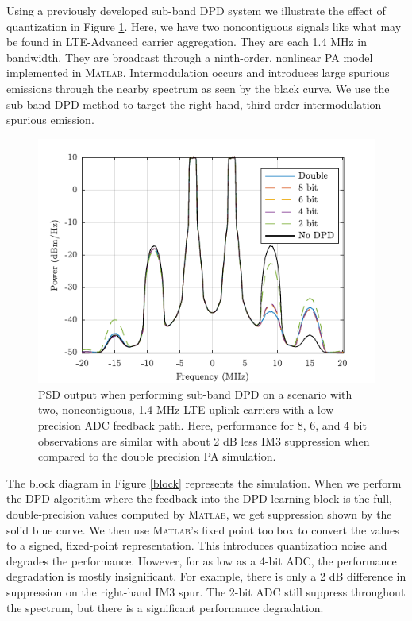 \documentclass[conference]{IEEEtran}
\begin{document}
Using a previously developed sub-band DPD system \cite{TMTT_SubbandDPD} we illustrate the effect of quantization in Figure \ref{subbandpsd}. Here, we have two noncontiguous signals like what may be found in LTE-Advanced carrier aggregation. They are each 1.4 MHz in bandwidth. They are broadcast through a ninth-order, nonlinear PA model implemented in \textsc{Matlab}. 
Intermodulation occurs and introduces large spurious emissions through the nearby spectrum as seen by the black curve. We use the sub-band DPD method to target the right-hand, third-order intermodulation spurious emission.

\begin{figure}[]
\centering
\includegraphics[]{SubBandPSD}
\caption{PSD output when performing sub-band DPD on a scenario with two, noncontiguous, 1.4 MHz LTE uplink carriers with a low precision ADC feedback path. Here, performance for 8, 6, and 4 bit observations are similar with about 2 dB less IM3 suppression when compared to the double precision PA simulation. }
\label{subbandpsd}
\end{figure}

The block diagram in Figure \ref{block} represents the simulation. When we perform the DPD algorithm where the feedback into the DPD learning block is the full, double-precision values computed by \textsc{Matlab}, we get suppression shown by the solid blue curve. We then use \textsc{Matlab}'s fixed point toolbox to convert the values to a signed, fixed-point representation. This introduces quantization noise and degrades the performance. However, for as low as a 4-bit ADC, the performance degradation is mostly insignificant. For example, there is only a 2 dB difference in suppression on the right-hand IM3 spur. The 2-bit ADC still suppress throughout the spectrum, but there is a significant performance degradation. 
\end{document}

